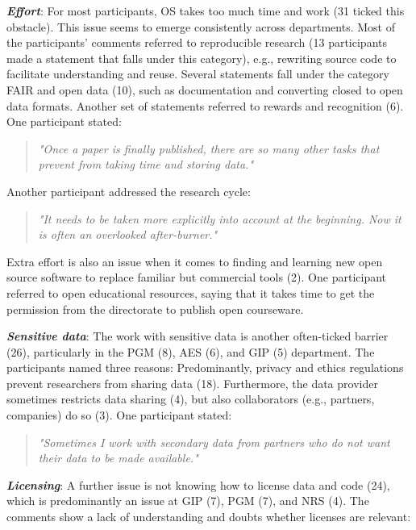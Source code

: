 \documentclass[gc, manuscript]{copernicus}
\begin{document}
\textit{\textbf{Effort}}: For most participants, OS takes too much time
and work (31 ticked this obstacle). This issue seems to emerge
consistently across departments. Most of the participants' comments
referred to reproducible research (13 participants made a statement that
falls under this category), e.g., rewriting source code to facilitate
understanding and reuse. Several statements fall under the category FAIR
and open data (10), such as documentation and converting closed to open
data formats. Another set of statements referred to rewards and
recognition (6). One participant stated:

\begin{quote}
\textit{"Once a paper is finally published, there are so many other tasks that prevent from taking time and storing data."}
\end{quote}

Another participant addressed the research cycle:

\begin{quote}
\textit{"It needs to be taken more explicitly into account at the beginning. Now it is often an overlooked after-burner."}
\end{quote}

Extra effort is also an issue when it comes to finding and learning new
open source software to replace familiar but commercial tools (2). One
participant referred to open educational resources, saying that it takes
time to get the permission from the directorate to publish open
courseware.

\textit{\textbf{Sensitive data}}: The work with sensitive data is
another often-ticked barrier (26), particularly in the PGM (8), AES (6),
and GIP (5) department. The participants named three reasons:
Predominantly, privacy and ethics regulations prevent researchers from
sharing data (18). Furthermore, the data provider sometimes restricts
data sharing (4), but also collaborators (e.g., partners, companies) do
so (3). One participant stated:

\begin{quote}
\textit{"Sometimes I work with secondary data from partners who do not want their data to be made available."}
\end{quote}

\textit{\textbf{Licensing}}: A further issue is not knowing how to
license data and code (24), which is predominantly an issue at GIP (7),
PGM (7), and NRS (4). The comments show a lack of understanding and
doubts whether licenses are relevant:
\end{document}
